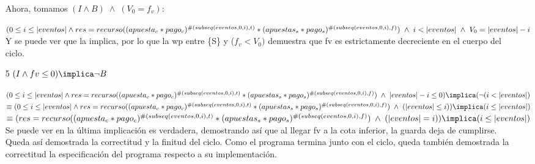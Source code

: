 \documentclass[10pt,a4paper]{article}
\begin{document}
\begin{itemize}[leftmargin=*]
Ahora, tomamos $(I \wedge B) \phantom{.} \wedge \phantom{.} (V_0 = f_{v})$:

$(0 \leq i \leq |eventos| \wedge \\ res = recurso((apuesta_c * pago_c)^{\#(subseq(eventos,0,i), t)} * (apuestas_s * pago_s)^{\#(subseq(eventos,0,i), f)}) \phantom{.} \wedge \phantom{.} i < |eventos| \phantom{.} \wedge \phantom{.} V_0 = |eventos| - i$\\

Y se puede ver que la implica, por lo que la wp entre \{S\} y ($f_v<V_0)$ demuestra que fv es estrictamente decreciente en el cuerpo del ciclo.

\item[5] $(I \wedge fv \leq 0) \implica \neg B$ \\ \vspace{0.3cm}

$(0 \leq i \leq |eventos| \wedge res = recurso((apuesta_c * pago_c)^{\#(subseq(eventos,0,i), t)} * (apuestas_s * pago_s)^{\#(subseq(eventos,0,i), f)}) \phantom{.} \wedge \phantom{.} |eventos| - i \leq 0) \implica (\neg (i < |eventos|)$\vspace{0.3cm}\\
$\equiv(0 \leq i \leq |eventos| \wedge res = recurso((apuesta_c * pago_c)^{\#(subseq(eventos,0,i), t)} * (apuestas_s * pago_s)^{\#(subseq(eventos,0,i), f)}) \phantom{.} \wedge \phantom{.} (|eventos| \leq i)) \implica (i \leq |eventos|)$\vspace{0.3cm}\\
$\equiv(res = recurso((apuesta_c * pago_c)^{\#(subseq(eventos,0,i), t)} * (apuestas_s * pago_s)^{\#(subseq(eventos,0,i), f)}) \phantom{.} \wedge \\ \phantom{.} (|eventos| = i)) \implica (i \leq |eventos|)$ \vspace{0.3cm}\\

\tab Se puede ver en la última implicación es verdadera, demostrando así que al llegar fv a la cota inferior, la guarda deja de cumplirse.\\

\tab Queda así demostrada la correctitud y la finitud del ciclo. Como el programa termina junto con el ciclo, queda también demostrada la correctitud la especificación del programa respecto a su implementación.

\vspace{0.3cm}

\end{itemize}
\end{document}

